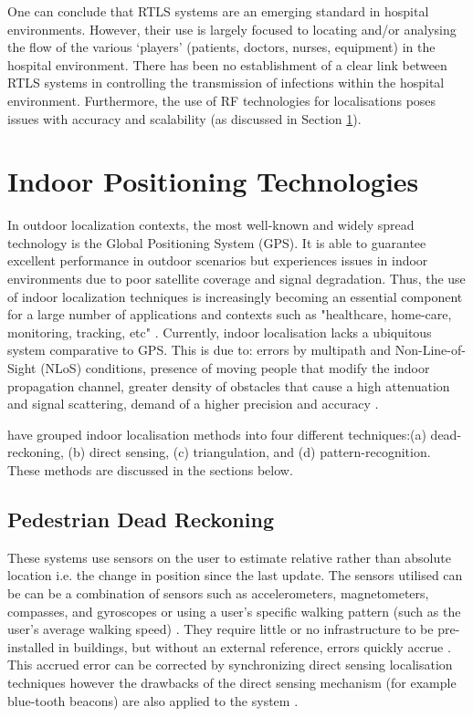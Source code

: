        One can conclude that RTLS systems are an emerging standard in hospital environments. However, their use is largely focused to locating and/or analysing the flow of the various `players' (patients, doctors, nurses, equipment) in the hospital environment. There has been no establishment of a clear link between RTLS systems in controlling the transmission of infections within the hospital environment. Furthermore, the use of RF technologies for localisations poses issues with accuracy and scalability (as discussed in Section \ref{ssec:litRev_indoor}). 
                
        \section{Indoor Positioning Technologies} \label{ssec:litRev_indoor}
        
        In outdoor localization contexts, the most well-known and widely spread technology is the Global Positioning System (GPS). It is able to guarantee excellent performance in outdoor scenarios but experiences issues in indoor environments due to poor satellite coverage and signal degradation. Thus, the use of indoor localization techniques is increasingly becoming an essential component for a large number of applications and contexts such as "healthcare, home-care, monitoring, tracking, etc" \cite{mainetti2014Indoorlit}. Currently, indoor localisation lacks a ubiquitous system comparative to GPS. This is due to: errors by multipath and Non-Line-of-Sight (NLoS) conditions, presence of moving people that modify the indoor propagation channel, greater density of obstacles that cause a high attenuation and signal scattering, demand of a higher precision and accuracy \cite{mainetti2014Indoorlit}.
        
        \citeauthor{fallah2013indoor} \cite{fallah2013indoor} have grouped indoor localisation methods into four different techniques:(a) dead-reckoning, (b) direct sensing, (c) triangulation, and (d) pattern-recognition. These methods are discussed in the sections below.
        
        	\subsection{Pedestrian Dead Reckoning}           
            These systems use sensors on the user to estimate relative rather than absolute location i.e. the change in position since the last update. The sensors utilised can be can be a combination of sensors such as accelerometers, magnetometers, compasses, and gyroscopes \cite{fallah2013indoor} or using a user’s specific walking pattern (such as the user’s average walking speed) \cite{wu2007pathplan}. They require little or no infrastructure to be pre-installed in buildings, but without an external reference, errors quickly accrue \cite{harle2013PIndoor}. This accrued error can be corrected by synchronizing direct sensing localisation techniques however the drawbacks of the direct sensing mechanism (for example blue-tooth beacons) are also applied to the system \cite{fallah2013indoor}.
            
